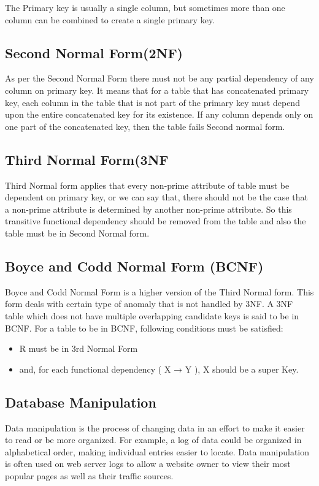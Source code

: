 The Primary key is usually a single column, but sometimes more than one column can be combined to create a single primary key.
\subsection{Second Normal Form(2NF)}
As per the Second Normal Form there must not be any partial dependency of any column on primary key. It means that for a table that has concatenated primary key, each column in the table that is not part of the primary key must depend upon the entire concatenated key for its existence. If any column depends only on one part of the concatenated key, then the table fails Second normal form.
\subsection{Third Normal Form(3NF}
Third Normal form applies that every non-prime attribute of table must be dependent on primary key, or we can say that, there should not be the case that a non-prime attribute is determined by another non-prime attribute. So this transitive functional dependency should be removed from the table and also the table must be in Second Normal form.
\subsection{Boyce and Codd Normal Form (BCNF)}
Boyce and Codd Normal Form is a higher version of the Third Normal form. This form deals with certain type of anomaly that is not handled by 3NF. A 3NF table which does not have multiple overlapping candidate keys is said to be in BCNF. For a table to be in BCNF, following conditions must be satisfied:
\begin{itemize}
	\item R must be in 3rd Normal Form
	\item and, for each functional dependency ( X → Y ), X should be a super Key. 
\end{itemize}
\subsection{Database Manipulation}
Data manipulation is the process of changing data in an effort to make it easier to read or be more organized. For example, a log of data could be organized in alphabetical order, making individual entries easier to locate. Data manipulation is often used on web server logs to allow a website owner to view their most popular pages as well as their traffic sources.

